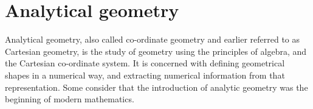          \chapter{Analytical geometry}
%     
%     
%     
%     
%   
%             
        \label{m39107*id66769}Analytical geometry, also called co-ordinate geometry and earlier referred to as Cartesian geometry, is the study of geometry using the principles of algebra, and the Cartesian co-ordinate system. It is concerned with defining geometrical shapes in a numerical way, and extracting numerical information from that representation. Some consider that the introduction of analytic geometry was the beginning of modern mathematics.\par 
      \label{m39107*eip-448}
